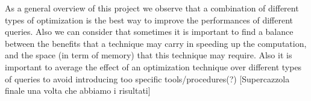 As a general overview of this project we observe that a combination of different types of optimization is the best way to improve the performances of different queries. Also we can consider that sometimes it is important to find a balance between the benefits that a technique may carry in speeding up the computation, and the space (in term of memory) that this technique may require. Also it is important to average the effect of an optimization technique over different types of queries to avoid introducing too specific tools/procedures(?)
[Supercazzola finale una volta che abbiamo i risultati]